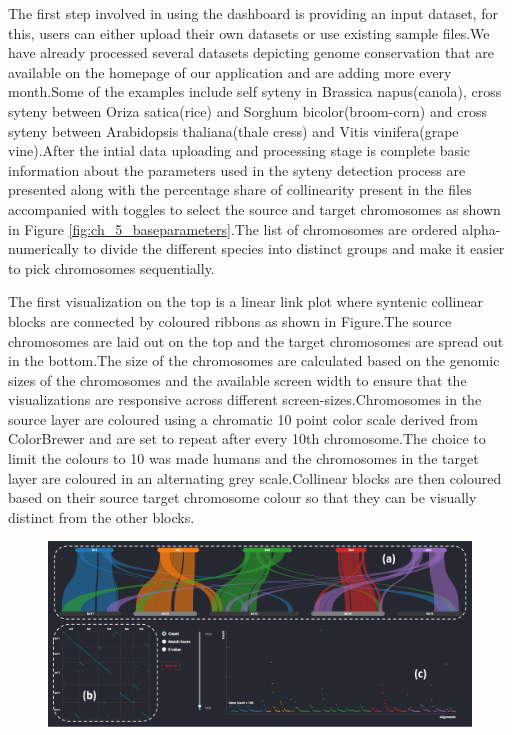 The first step involved in using the dashboard is providing an input dataset, for this, users can either upload their own datasets or use existing sample files.We have already processed several datasets depicting genome conservation that are available on the homepage of our application and are adding more every month.Some of the examples include self syteny in Brassica napus(canola), cross syteny between Oriza satica(rice) and Sorghum bicolor(broom-corn) and cross syteny between Arabidopsis thaliana(thale cress) and Vitis vinifera(grape vine).After the intial data uploading and processing stage is complete basic information about the parameters used in the syteny detection process are presented along with the percentage share of collinearity present in the files accompanied with toggles to select the source and target chromosomes as shown in Figure \ref{fig:ch_5_baseparameters}.The list of chromosomes are ordered alpha-numerically to divide the different species into distinct groups and make it easier to pick chromosomes sequentially.






The first visualization on the top is a linear link plot where syntenic collinear blocks are connected by coloured ribbons as shown in Figure.The source chromosomes are laid out on the top and the target chromosomes are spread out in the bottom.The size of the chromosomes are calculated based on the genomic sizes of the chromosomes and the available screen width to ensure that the visualizations are responsive across different screen-sizes.Chromosomes in the source layer are coloured using a chromatic 10 point color scale derived from ColorBrewer\cite{colorbrewer} and are set to repeat after every 10th chromosome.The choice to limit the colours to 10 was made humans and the chromosomes in the target layer are coloured in an alternating grey scale.Collinear blocks are then coloured based on their source target chromosome colour so that they can be visually distinct from the other blocks.

\begin{figure}
  \centering
  \includegraphics[width=.75\linewidth]{images/ch_1_dashboard.PNG}
  \label{fig:ch_4_dashboard}
\end{figure}



